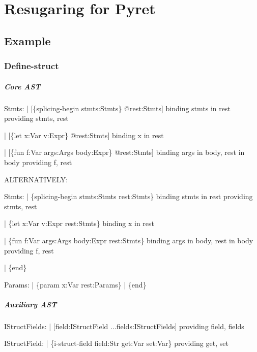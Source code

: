 \newcommand{\bind}[3]{\texttt{bind } #3 \texttt{ in } #2 \ensuremath{\in #1}}
\newcommand{\prov}[2]{\texttt{provide } #2 \ensuremath{\in #1}}

\newcommand{\saysSubs}[4]{#1 \vdash #2 \bullet #3 = #4}
\newcommand{\saysMatch}[4]{#1 \vdash #2 / #3 = #4}

\newcommand{\Refn}{\textrm{Refn}}
\newcommand{\Decl}{\textrm{Decl}}
\newcommand{\String}{\textrm{String}}


\chapter{Resugaring for Pyret}

\section{Example}

\subsection{Define-struct}

\paragraph{Core AST}
\begin{codes}
Stmts:
| [\{splicing-begin stmts:Stmts\} @rest:Stmts]
   binding stmts in rest
   providing stmts, rest

| [\{let x:Var v:Expr\} @rest:Stmts]
   binding x in rest

| [\{fun f:Var args:Args body:Expr\} @rest:Stmts]
   binding args in body, rest in body
   providing f, rest

ALTERNATIVELY:

Stmts:
| \{splicing-begin stmts:Stmts rest:Stmts\}
   binding stmts in rest
   providing stmts, rest

| \{let x:Var v:Expr rest:Stmts\}
   binding x in rest

| \{fun f:Var args:Args body:Expr rest:Stmts\}
   binding args in body, rest in body
   providing f, rest

| \{end\}

Params:
| \{param x:Var rest:Params\}
| \{end\}
\end{codes}

\paragraph{Auxiliary AST}
\begin{codes}
IStructFields:
| [field:IStructField ...fields:IStructFields]
  providing field, fields

IStructField:
| \{i-struct-field field:Str get:Var set:Var\}
  providing get, set
\end{codes}

